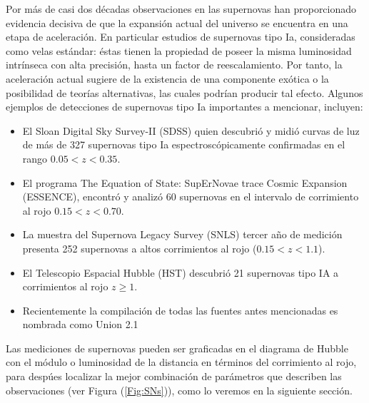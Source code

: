 \documentclass[10.5pt,prb,
               showpacs,            %
               preprintnumbers,     %
               aps,                 %
               prl,          	    %
               letterpaper,             %
               superscriptaddress,      %
               nofootinbib,         %
               tightenlines,        %
               floats,floatfix      %
               ,usenatbib]{revtex4-1}%
\begin{document}
Por m\'as de casi dos d\'ecadas observaciones en las supernovas han proporcionado 
evidencia decisiva de que la expansi\'on actual del universo se encuentra en una etapa de 
aceleraci\'on. En particular estudios de supernovas tipo Ia, consideradas como velas est\'andar:
\'estas tienen la propiedad de poseer la misma luminosidad intr\'inseca con alta precisi\'on, hasta un factor 
de reescalamiento. Por tanto, la aceleraci\'on actual sugiere de la existencia de una componente ex\'otica
o la posibilidad de teor\'ias alternativas, las cuales podr\'ian producir tal efecto. Algunos ejemplos 
de detecciones de supernovas tipo Ia importantes a mencionar, incluyen:

	\begin{itemize}
		\item El Sloan Digital Sky Survey-II (SDSS) quien descubri\'o y midi\'o curvas de luz de m\'as de 327 supernovas
			tipo Ia espectrosc\'opicamente confirmadas en el rango $0.05 < z < 0.35$.
		\item El programa The Equation of State: SupErNovae trace Cosmic Expansion (ESSENCE),
			encontr\'o y analiz\'o 60 supernovas en el intervalo de corrimiento al rojo $0.15 < z < 0.70$.
		\item La muestra del Supernova Legacy Survey (SNLS) tercer a\~no de medici\'on presenta 252 supernovas a altos
			corrimientos al rojo ($0.15 < z < 1.1$).
		\item El Telescopio Espacial Hubble (HST) descubri\'o 21 supernovas tipo IA a corrimientos al rojo $z\geq 1$.
		\item Recientemente la compilaci\'on de todas las fuentes antes mencionadas es nombrada
			como Union 2.1
	\end{itemize}

Las mediciones de supernovas pueden ser graficadas en el diagrama de Hubble con el m\'odulo o luminosidad de la distancia 
en t\'erminos del corrimiento al rojo, para desp\'ues localizar la mejor combinaci\'on de par\'ametros que describen las observaciones
(ver Figura (\ref{Fig:SNs})), como lo veremos en la siguiente secci\'on.
\end{document}
